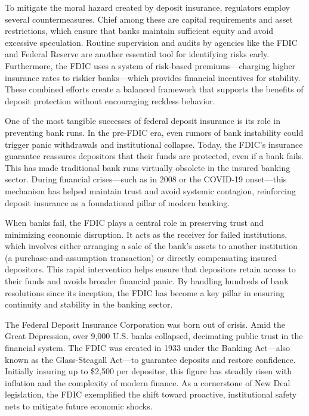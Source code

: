 To mitigate the moral hazard created by deposit insurance, regulators employ several countermeasures. Chief among these are capital requirements and asset restrictions, which ensure that banks maintain sufficient equity and avoid excessive speculation. Routine supervision and audits by agencies like the FDIC and Federal Reserve are another essential tool for identifying risks early. Furthermore, the FDIC uses a system of risk-based premiums—charging higher insurance rates to riskier banks—which provides financial incentives for stability. These combined efforts create a balanced framework that supports the benefits of deposit protection without encouraging reckless behavior.

One of the most tangible successes of federal deposit insurance is its role in preventing bank runs. In the pre-FDIC era, even rumors of bank instability could trigger panic withdrawals and institutional collapse. Today, the FDIC’s insurance guarantee reassures depositors that their funds are protected, even if a bank fails. This has made traditional bank runs virtually obsolete in the insured banking sector. During financial crises—such as in 2008 or the COVID-19 onset—this mechanism has helped maintain trust and avoid systemic contagion, reinforcing deposit insurance as a foundational pillar of modern banking.

When banks fail, the FDIC plays a central role in preserving trust and minimizing economic disruption. It acts as the receiver for failed institutions, which involves either arranging a sale of the bank’s assets to another institution (a purchase-and-assumption transaction) or directly compensating insured depositors. This rapid intervention helps ensure that depositors retain access to their funds and avoids broader financial panic. By handling hundreds of bank resolutions since its inception, the FDIC has become a key pillar in ensuring continuity and stability in the banking sector.

The Federal Deposit Insurance Corporation was born out of crisis. Amid the Great Depression, over 9,000 U.S. banks collapsed, decimating public trust in the financial system. The FDIC was created in 1933 under the Banking Act—also known as the Glass-Steagall Act—to guarantee deposits and restore confidence. Initially insuring up to \$2,500 per depositor, this figure has steadily risen with inflation and the complexity of modern finance. As a cornerstone of New Deal legislation, the FDIC exemplified the shift toward proactive, institutional safety nets to mitigate future economic shocks.

